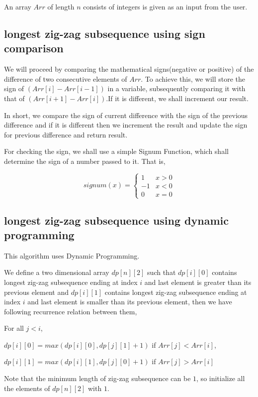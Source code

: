 \documentclass[conference]{IEEEtran}
\begin{document}
An array $Arr$ of length $n$ consists of integers is given as an input from the user. 



\subsection{longest zig-zag subsequence using sign comparison}

We will proceed by comparing the mathematical signs(negative or positive) of the difference of two consecutive elements of $Arr$. To achieve this, we will store the sign of $(Arr[i]-Arr[i-1])$ in a variable, subsequently comparing it with that of $(Arr[i+1]-Arr[i])$.If it is different, we shall increment our result. 

In short, we compare the sign of current difference with the sign of the previous difference and if it is different then we increment the result and update the sign for previous difference and return result.

For checking the sign, we shall use a simple Signum Function, which shall determine the sign of a number passed to it. That is,

\[signum(x) =  \begin{cases} 
      1 & x > 0\\
      -1 & x<0\\
      0 & x=0
   \end{cases}
\]

\subsection{longest zig-zag subsequence using dynamic programming}
This algorithm uses Dynamic Programming.

We define a two dimensional array $dp[n][2]$ such that $dp[i][0]$ contains longest zig-zag subsequence ending at index $i$ and last element is greater than its previous element and $dp[i][1]$ contains longest zig-zag subsequence ending at index $i$ and last element is smaller than its previous element, then we have following recurrence relation between them,

For all $j<i$,

$dp[i][0] = max(dp[i][0],dp[j][1]+1)$ if $Arr[j]<Arr[i]$,

$dp[i][1] = max(dp[i][1],dp[j][0]+1)$ if $Arr[j]>Arr[i]$

Note that the minimum length of zig-zag subsequence can be $1$, so initialize all the elements of $dp[n][2]$ with $1$.
\end{document}
